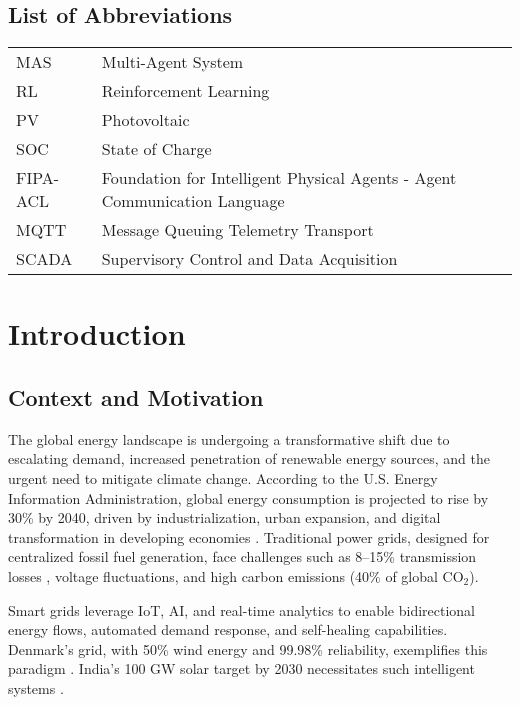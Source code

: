 \documentclass[12pt]{report}
\begin{document}
\clearpage
\listoffigures
{}

\clearpage
\listoftables
{}

\clearpage
\section*{List of Abbreviations}
\begin{tabular}{l p{4in}}
MAS & Multi-Agent System \\
RL & Reinforcement Learning \\
PV & Photovoltaic \\
SOC & State of Charge \\
FIPA-ACL & Foundation for Intelligent Physical Agents - Agent Communication Language \\
MQTT & Message Queuing Telemetry Transport \\
SCADA & Supervisory Control and Data Acquisition \\
\end{tabular}

\clearpage
\chapter{Introduction}
\label{chap:introduction}
\section{Context and Motivation}
The global energy landscape is undergoing a transformative shift due to escalating demand, increased penetration of renewable energy sources, and the urgent need to mitigate climate change. According to the U.S. Energy Information Administration, global energy consumption is projected to rise by 30\% by 2040, driven by industrialization, urban expansion, and digital transformation in developing economies \cite{eia2023}. Traditional power grids, designed for centralized fossil fuel generation, face challenges such as 8--15\% transmission losses \cite{iea2021}, voltage fluctuations, and high carbon emissions (40\% of global CO$_2$).

Smart grids leverage IoT, AI, and real-time analytics to enable bidirectional energy flows, automated demand response, and self-healing capabilities. Denmark's grid, with 50\% wind energy and 99.98\% reliability, exemplifies this paradigm \cite{grid4eu2022}. India's 100 GW solar target by 2030 necessitates such intelligent systems \cite{mnre2023}.
\end{document}
